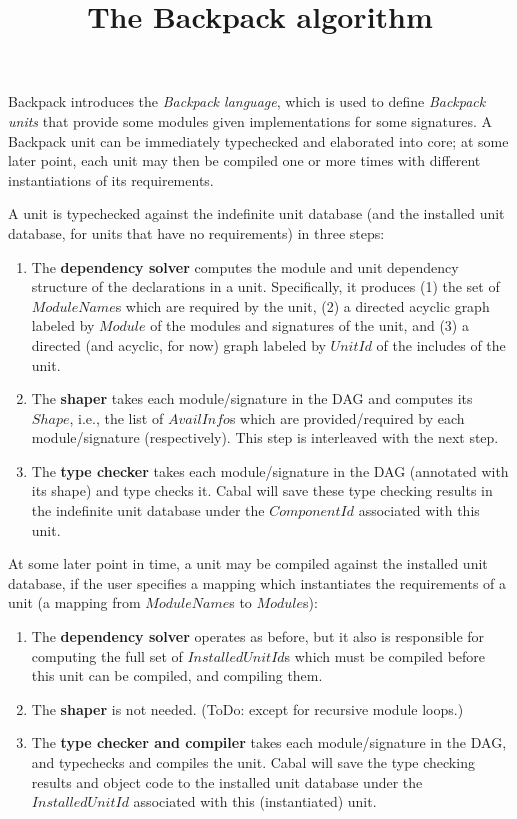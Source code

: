 \documentclass{article}
\title{The Backpack algorithm}
\newcommand{\I}[1]{\ensuremath{\mathit{#1}}}
\begin{document}
\maketitle

\noindent Backpack introduces the \emph{Backpack language}, which is
used to define \emph{Backpack units} that provide some modules given
implementations for some signatures.  A Backpack unit can be
immediately typechecked and elaborated into core; at some later point,
each unit may then be compiled one or more times with different
instantiations of its requirements.

A unit is typechecked against the indefinite unit database
(and the installed unit database, for units that have no
requirements) in three steps:

\begin{enumerate}
    \item The \textbf{dependency solver} computes the module and unit
    dependency structure of the declarations in a unit.  Specifically,
    it produces (1) the set of \I{ModuleName}s which are required
    by the unit, (2) a directed acyclic graph labeled by \I{Module} of
    the modules and signatures of the unit, and (3) a directed (and acyclic, for now)
    graph labeled by \I{UnitId} of the includes of the unit.

    \item The \textbf{shaper} takes each module/signature in the DAG and
    computes its \I{Shape}, i.e., the list of \I{AvailInfo}s which are
    provided/required by each module/signature (respectively).  This
    step is interleaved with the next step.

    \item The \textbf{type checker} takes each
    module/signature in the DAG (annotated with its shape) and type
    checks it.  Cabal will save these type checking results
    in the indefinite unit database under the \I{ComponentId} associated
    with this unit.
\end{enumerate}

At some later point in time, a unit may be compiled against
the installed unit database, if the user specifies a mapping which
instantiates the requirements of a unit (a mapping from \I{ModuleName}s to \I{Module}s):

\begin{enumerate}
    \item The \textbf{dependency solver} operates as before, but it also
    is responsible for computing the full set of \I{InstalledUnitId}s which
    must be compiled before this unit can be compiled, and compiling
    them.

    \item The \textbf{shaper} is not needed. (ToDo: except for recursive
    module loops.)

    \item The \textbf{type checker and compiler} takes each
    module/signature in the DAG, and typechecks and compiles the unit.
    Cabal will save the type checking results and object
    code to the installed unit database under the \I{InstalledUnitId}
    associated with this (instantiated) unit.
\end{enumerate}
\end{document}
